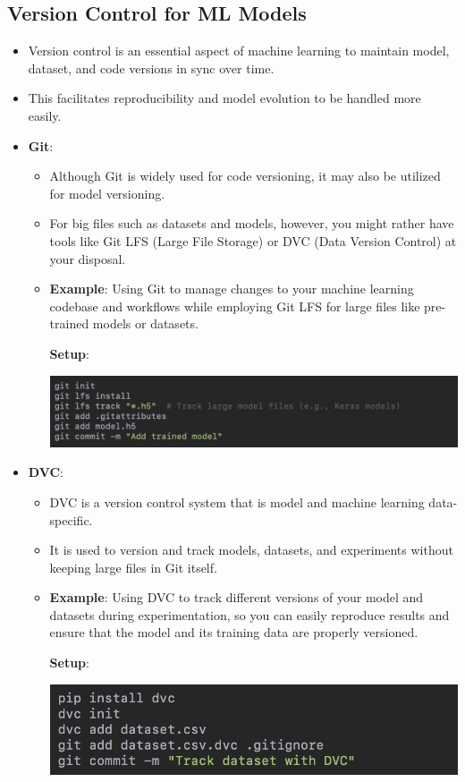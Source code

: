 \documentclass{article}
\begin{document}
\subsection{Version Control for ML Models}
\begin{itemize}
\item Version control is an essential aspect of machine learning to maintain model, dataset, and code versions in sync over time.
\item This facilitates reproducibility and model evolution to be handled more easily.

\item \textbf{Git}:
\begin{itemize}
\item Although Git is widely used for code versioning, it may also be utilized for model versioning.
\item For big files such as datasets and models, however, you might rather have tools like Git LFS (Large File Storage) or DVC (Data Version Control) at your disposal.
\item \textbf{Example}: Using Git to manage changes to your machine learning codebase and workflows while employing Git LFS for large files like pre-trained models or datasets.

\textbf{Setup}:

\includegraphics[width=14cm,height=4
cm]{Git.png}
\end{itemize}
\item \textbf{DVC}:
\begin{itemize}
\item DVC is a version control system that is model and machine learning data-specific.
\item It is used to version and track models, datasets, and experiments without keeping large files in Git itself.
\item \textbf{Example}: Using DVC to track different versions of your model and datasets during experimentation, so you can easily reproduce results and ensure that the model and its training data are properly versioned.

\textbf{Setup}:

\includegraphics[width=14cm,height=4
cm]{DVC.png}
\end{itemize}
\end{itemize}
\end{document}
